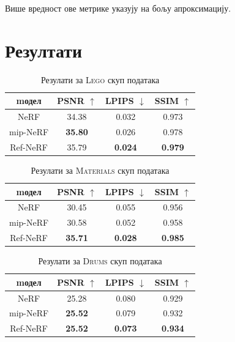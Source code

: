 \documentclass[12pt, a4paper, twoside]{book}
\numberwithin{equation}{chapter}
\numberwithin{theorem}{section}
\numberwithin{definition}{section}
\numberwithin{definitionChapter}{chapter}
\begin{document}
Више вредност ове метрике указују на бољу апроксимацију.

\section{Резултати}

	\begin{table}[H]
		\centering
		\begin{tabular}{cccc} \toprule
			{mодел}			& {PSNR $\uparrow$}	& {LPIPS $\downarrow$}	& {SSIM $\uparrow$} \\ \midrule
			{NeRF}			& 34.38				& 0.032					& 0.973 \\ 
			{mip-NeRF}		& \textbf{35.80}	& 0.026					& 0.978 \\
			{Ref-NeRF}		& 35.79				& \textbf{0.024}		& \textbf{0.979} \\ \bottomrule
		\end{tabular}
		\caption{Резулати за \textsc{Lego} скуп података}
		\label{table-lego}
	\end{table}

	\begin{table}[H]
		\centering
		\begin{tabular}{cccc} \toprule
			{mодел}			& {PSNR $\uparrow$} & {LPIPS $\downarrow$}	& {SSIM $\uparrow$} \\ \midrule
			{NeRF} 			& 30.45 			& 0.055					& 0.956 \\ 
			{mip-NeRF}		& 30.58 			& 0.052					& 0.958 \\
			{Ref-NeRF}		& \textbf{35.71}	& \textbf{0.028}		& \textbf{0.985} \\ \bottomrule
		\end{tabular}
		\caption{Резулати за \textsc{Materials} скуп података}
		\label{table-materials}
	\end{table}

	\begin{table}[H]
		\centering
		\begin{tabular}{cccc} \toprule
			{mодел}			& {PSNR $\uparrow$} & {LPIPS $\downarrow$}	& {SSIM $\uparrow$} \\ \midrule
			{NeRF}			& 25.28				& 0.080 				& 0.929 \\ 
			{mip-NeRF}		& \textbf{25.52}	& 0.079					& 0.932 \\
			{Ref-NeRF}		& \textbf{25.52}	& \textbf{0.073}		& \textbf{0.934} \\ \bottomrule
		\end{tabular}
		\caption{Резулати за \textsc{Drums} скуп података}
		\label{table-drums}
	\end{table}
\end{document}

